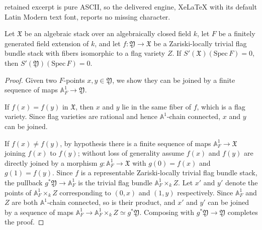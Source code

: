 \documentclass[10pt,a4paper]{amsart}
\newcommand{\bb}[1]{\mathbb{#1}}
\newcommand{\mf}[1]{\mathfrak{#1}}
\begin{document}
retained excerpt is pure ASCII, so the delivered engine, XeLaTeX with its default Latin Modern text font, reports no missing character.
	\begin{proposition}\label{prop:flag-bundle-a1-connected}
		Let $\mf{X}$ be an algebraic stack over an algebraically closed field $k$,
		let $F$ be a finitely generated field extension of $k$, and let
		$f: \mf{Y}\longrightarrow \mf{X}$ be a Zariski-locally trivial flag bundle
		stack with fibers isomorphic to a flag variety $Z$. If
		$S'(\mf{X})(\mathrm{Spec}\,F)=0$, then $S'(\mf{Y})(\mathrm{Spec}\,F)=0$.
	\end{proposition}

	\begin{proof}
		Given two $F$-points $x, y \in \mf{Y}$, we show they can be joined by a
		finite sequence of maps $\bb{A}^1_F\longrightarrow\mf{Y}$.
		
		If $f(x)=f(y)$ in $\mf{X}$, then $x$ and $y$ lie in the same fiber of $f$,
		which is a flag variety. Since flag varieties are rational and hence
		$\bb{A}^1$-chain connected, $x$ and $y$ can be joined.
		
		If $f(x)\neq f(y)$, by hypothesis there is a finite sequence of maps
		$\bb{A}^1_F\to\mf{X}$ joining $f(x)$ to $f(y)$; without loss of generality
		assume $f(x)$ and $f(y)$ are directly joined by a morphism
		$g: \bb{A}^1_F\longrightarrow \mf{X}$ with $g(0)=f(x)$ and $g(1)=f(y)$.
		Since $f$ is a representable Zariski-locally trivial flag bundle stack, the
		pullback $g^*\mf{Y}\longrightarrow \bb{A}^1_F$ is the trivial flag bundle
		$\bb{A}^1_F\times_k Z$. Let $x'$ and $y'$ denote the points of
		$\bb{A}^1_F\times_k Z$ corresponding to $(0,x)$ and $(1,y)$ respectively.
		Since $\bb{A}^1_F$ and $Z$ are both $\bb{A}^1$-chain connected, so is their
		product, and $x'$ and $y'$ can be joined by a sequence of maps
		$\bb{A}^1_F\to \bb{A}^1_F\times_k Z \simeq g^*\mf{Y}$. Composing with
		$g^*\mf{Y}\to\mf{Y}$ completes the proof.
	\end{proof}
\end{document}
